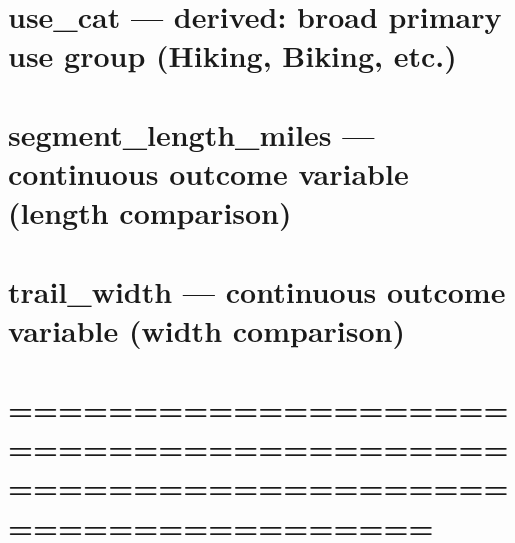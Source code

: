 \documentclass[
]{article}
\begin{document}
\section{use\_cat --- derived: broad primary use group (Hiking, Biking,
etc.)}\label{use_cat-derived-broad-primary-use-group-hiking-biking-etc.}

\section{segment\_length\_miles --- continuous outcome variable (length
comparison)}\label{segment_length_miles-continuous-outcome-variable-length-comparison}

\section{trail\_width --- continuous outcome variable (width
comparison)}\label{trail_width-continuous-outcome-variable-width-comparison}

\section{=============================================================================}\label{section-11}
\end{document}
